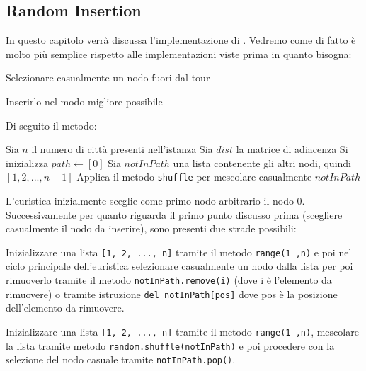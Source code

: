 \documentclass[a4paper,12pt]{report}
\begin{document}
\subsection{Random Insertion}
In questo capitolo verrà discussa l'implementazione di . Vedremo come di fatto è molto più semplice rispetto alle implementazioni viste prima in quanto bisogna:
\begin{legal}
  \item Selezionare casualmente un nodo fuori dal tour
  \item Inserirlo nel modo migliore possibile
\end{legal}
Di seguito il metodo:
\begin{tcolorbox}[colframe=black, colback=white, boxrule=0.5pt, title=Random Insertion Versione 1, coltitle=black, fonttitle=\bfseries, colbacktitle=white, breakable]
  \begin{algorithmic}[1]
    \State Sia $n$ il numero di città presenti nell'istanza
    \State Sia $dist$ la matrice di adiacenza
    \State Si inizializza $path \gets [0]$
    \State Sia $notInPath$ una lista contenente gli altri nodi, quindi $[1, 2, ..., n - 1]$
    \State Applica il metodo \lstinline!shuffle! per mescolare casualmente $notInPath$
  \end{algorithmic}
\end{tcolorbox}
L'euristica inizialmente sceglie come primo nodo arbitrario il nodo 0. Successivamente 
per quanto riguarda il primo punto discusso prima (scegliere casualmente il nodo da inserire), sono presenti due strade possibili:
\begin{legal}
  \item Inizializzare una lista \lstinline![1, 2, ..., n]! tramite il metodo \lstinline!range(1 ,n)! e poi nel ciclo principale dell'euristica selezionare casualmente un nodo dalla lista per poi rimuoverlo tramite il metodo \lstinline!notInPath.remove(i)! (dove i è l'elemento da rimuovere) o tramite istruzione \lstinline!del notInPath[pos]! dove pos è la posizione dell'elemento da rimuovere.
  \item Inizializzare una lista \lstinline![1, 2, ..., n]! tramite il metodo \lstinline!range(1 ,n)!, mescolare la lista tramite metodo \lstinline!random.shuffle(notInPath)! e poi procedere con la selezione del nodo casuale tramite \lstinline!notInPath.pop()!.
\end{legal}
\end{document}
